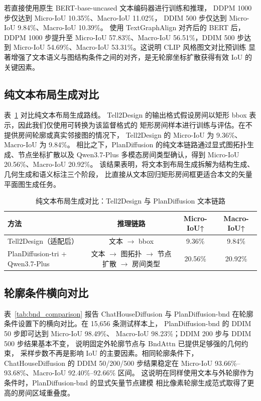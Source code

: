 若直接使用原生 BERT-base-uncased 文本编码器进行训练和推理，
DDPM 1000 步仅达到 Micro-IoU 10.35\%、Macro-IoU 11.02\%，
DDIM 500 步仅达到 Micro-IoU 9.84\%、Macro-IoU 10.39\%。
使用 TextGraphAlign 对齐后的 BERT 后，DDPM 1000 步提升至
Micro-IoU 57.83\%、Macro-IoU 56.51\%，DDIM 500 步达到
Micro-IoU 54.69\%、Macro-IoU 53.31\%。这说明 CLIP 风格图文对比预训练
显著增强了文本语义与图结构条件之间的对齐，是无轮廓坐标扩散获得有效 IoU 的关键因素。

\subsection{纯文本布局生成对比}
\label{subsec:text_only_results}

表~\ref{tab:text_only_baseline} 对比纯文本布局生成路线。
Tell2Design 的输出格式假设房间以矩形 bbox 表示，因此我们仅使用可转换为该监督格式的
矩形房间样本进行训练与评估。在不提供房间轮廓或真实邻接图的情况下，
Tell2Design 的 Micro-IoU 为 9.36\%、Macro-IoU 为 9.84\%。
相比之下，PlanDiffusion 的纯文本链路通过显式图拓扑生成、节点坐标扩散以及
Qwen3.7-Plus 多模态房间类型确认，得到 Micro-IoU 20.56\%、Macro-IoU 20.92\%。
该结果表明，将文本到布局生成拆解为结构生成、几何生成和语义标注三个阶段，
比直接从文本回归矩形房间框更适合本文的矢量平面图生成任务。

\begin{table}[h]
\centering
\caption{纯文本布局生成对比：Tell2Design 与 PlanDiffusion 文本链路}
\label{tab:text_only_baseline}
\small
\begin{tabular}{lccc}
\toprule
方法 & 推理链路 & Micro-IoU↑ & Macro-IoU↑ \\
\midrule
Tell2Design（适配后） & 文本 $\to$ bbox & 9.36\% & 9.84\% \\
PlanDiffusion-tri + Qwen3.7-Plus & 文本 $\to$ 图拓扑 $\to$ 节点扩散 $\to$ 房间类型 & 20.56\% & 20.92\% \\
\bottomrule
\end{tabular}
\end{table}

\subsection{轮廓条件横向对比}
\label{subsec:boundary_results}

表~\ref{tab:bnd_comparison} 报告 ChatHouseDiffusion 与 PlanDiffusion-bnd
在轮廓条件设置下的横向对比。在 15,656 条测试样本上，
PlanDiffusion-bnd 的 DDIM 50 步即可达到 Micro-IoU 98.49\%、
Macro-IoU 98.23\%；DDIM 200 步与 DDIM 500 步结果基本不变，
说明固定外轮廓节点与 $\mathrm{BndAttn}$ 已提供足够强的几何约束，
采样步数不再是影响 IoU 的主要因素。相同轮廓条件下，
ChatHouseDiffusion 的 DDIM 50/200/500 步结果稳定在
Micro-IoU 93.66\%--93.68\%、Macro-IoU 92.40\%--92.66\% 区间。
这说明在同样使用文本与外轮廓作为条件时，PlanDiffusion-bnd 的显式矢量节点建模
相比像素轮廓生成范式取得了更高的房间区域重叠度。

